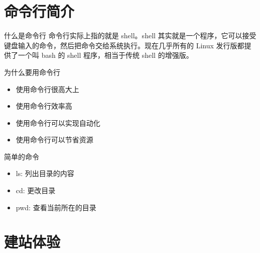 \documentclass[UTF8]{ctexbeamer}
\begin{document}
\section{命令行简介}
\begin{frame}{什么是命令行}
    命令行实际上指的就是 shell。shell 其实就是一个程序，它可以接受键盘输入的命令，然后把命令交给系统执行。现在几乎所有的 Linux 发行版都提供了一个叫 bash 的 shell 程序，相当于传统 shell 的增强版。
\end{frame}

\begin{frame}{为什么要用命令行}
\begin{itemize}
    \item 使用命令行很高大上
    \item 使用命令行效率高
    \item 使用命令行可以实现自动化
    \item 使用命令行可以节省资源
\end{itemize}
\end{frame}

\begin{frame}{简单的命令}
    \begin{itemize}
        \item ls: 列出目录的内容
        \item cd: 更改目录
        \item pwd: 查看当前所在的目录
    \end{itemize}
\end{frame}
\section{建站体验}
\end{document}
